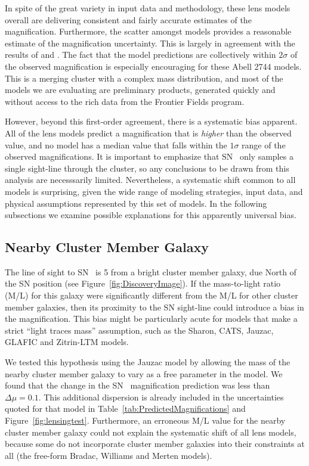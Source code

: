 In spite of the great variety in input data and methodology, these
lens models overall are delivering consistent and fairly accurate
estimates of the magnification.  Furthermore, the scatter amongst
models provides a reasonable estimate of the magnification
uncertainty.  This is largely in agreement with the results
of  and \citet{Nordin:2014}.  The fact that the
model predictions are collectively within $2\sigma$ of the observed
magnification is especially encouraging for these Abell 2744
models. This is a merging cluster with a complex mass distribution,
and most of the models we are evaluating are preliminary products,
generated quickly and without access to the rich data from the
Frontier Fields program.

However, beyond this first-order agreement, there is a systematic bias
apparent. All of the lens models predict a magnification that is {\it
higher} than the observed value, and no model has a median value that
falls within the $1\sigma$ range of the observed magnifications.  It
is important to emphasize that SN \tomas\ only samples a single
sight-line through the cluster, so any conclusions to be drawn from
this analysis are necesssarily limited.  Nevertheless, a systematic shift
common to all models is surprising, given the wide range of modeling
strategies, input data, and physical assumptions represented by this
set of models.  In the following subsections we examine possible
explanations for this apparently universal bias.

\subsection{Nearby Cluster Member Galaxy}
\label{sec:NearbyClusterMemberGalaxy}

The line of sight to SN \tomas\ is 5 from a bright cluster
member galaxy, due North of the SN position (see
Figure~\ref{fig:DiscoveryImage}).  If the mass-to-light ratio (M/L)
for this galaxy were significantly different from the M/L for other
cluster member galaxies, then its proximity to the SN sight-line could
introduce a bias in the magnification.  This bias might be
particularly acute for models that make a strict ``light traces mass''
assumption, such as the Sharon, CATS, Jauzac, GLAFIC and Zitrin-LTM
models.  

We tested this hypothesis using the Jauzac model by allowing the mass
of the nearby cluster member galaxy to vary as a free parameter in the
model. We found that the change in the SN \tomas\ magnification
prediction was less than $\Delta\mu=0.1$.  This additional dispersion
is already included in the uncertainties quoted for that model in
Table~\ref{tab:PredictedMagnifications} and
Figure~\ref{fig:lensingtest}.  Furthermore, an erroneous M/L
value for the nearby cluster member galaxy could not explain the
systematic shift of all lens models, because some do not incorporate
cluster member galaxies into their constraints at all (the free-form
Bradac, Williams and Merten models).

